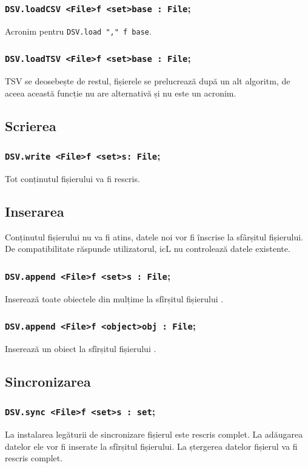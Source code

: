 \subsubsection{\lstinline|DSV.loadCSV <File>f <set>base : File|;}

Acronim pentru \lstinline|DSV.load "," f base|.

\subsubsection{\lstinline|DSV.loadTSV <File>f <set>base : File|;}

TSV se deosebește de restul, fișierele se prelucrează după un alt algoritm, de aceea această funcție nu are alternativă și nu este un acronim.

\subsection{Scrierea}

\subsubsection{\lstinline|DSV.write <File>f <set>s: File|;}

Tot conținutul fișierului va fi rescris.

\subsection{Inserarea}

Conținutul fișierului nu va fi atins, datele noi vor fi înscrise la sfârșitul fișierului. De compatibilitate răspunde utilizatorul, icL nu controlează datele existente.

\subsubsection{\lstinline|DSV.append <File>f <set>s : File|;}

Inserează toate obiectele din mulțime la sfîrșitul fișierului .

\subsubsection{\lstinline|DSV.append <File>f <object>obj : File|;}

Inserează un obiect la sfîrșitul fișierului .

\subsection{Sincronizarea}

\subsubsection{\lstinline|DSV.sync <File>f <set>s : set|;}

La instalarea legăturii de sincronizare fișierul este rescris complet. La adăugarea datelor ele vor fi inserate la sfîrșitul fișierului. La ștergerea datelor fișierul va fi rescris complet.


